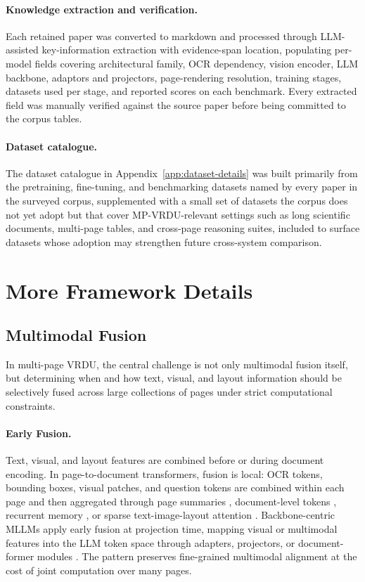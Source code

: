 \documentclass[11pt]{article}
\begin{document}
\paragraph{Knowledge extraction and verification.}
Each retained paper was converted to markdown and processed through LLM-assisted key-information extraction with evidence-span location, populating per-model fields covering architectural family, OCR dependency, vision encoder, LLM backbone, adaptors and projectors, page-rendering resolution, training stages, datasets used per stage, and reported scores on each benchmark. Every extracted field was manually verified against the source paper before being committed to the corpus tables.

\paragraph{Dataset catalogue.}
The dataset catalogue in Appendix~\ref{app:dataset-details} was built primarily from the pretraining, fine-tuning, and benchmarking datasets named by every paper in the surveyed corpus, supplemented with a small set of datasets the corpus does not yet adopt but that cover MP-VRDU-relevant settings such as long scientific documents, multi-page tables, and cross-page reasoning suites, included to surface datasets whose adoption may strengthen future cross-system comparison.

\section{More Framework Details}
\label{sec:framework-details}

\subsection{Multimodal Fusion}
\label{app:fusion}
In multi-page VRDU, the central challenge is not only multimodal fusion itself, but determining when and how text, visual, and layout information should be selectively fused across large collections of pages under strict computational constraints.

\paragraph{Early Fusion.}
Text, visual, and layout features are combined before or during document encoding. In page-to-document transformers, fusion is local: OCR tokens, bounding boxes, visual patches, and question tokens are combined within each page and then aggregated through page summaries \cite{tito2023hierarchical}, document-level tokens \cite{blau2024gram}, recurrent memory \cite{dong2024multi}, or sparse text-image-layout attention \cite{borchmann2025arctic}. Backbone-centric MLLMs apply early fusion at projection time, mapping visual or multimodal features into the LLM token space through adapters, projectors, or document-former modules \cite{tanaka2024instructdoc, duan2025docopilot, jia2024leopard}. The pattern preserves fine-grained multimodal alignment at the cost of joint computation over many pages.
\end{document}

